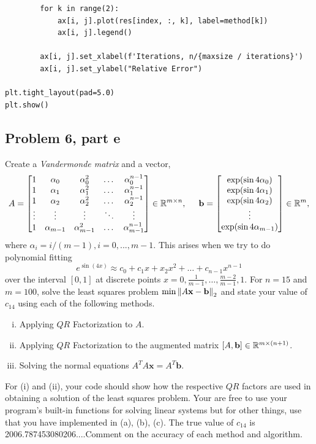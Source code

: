 \begin{solution}
\begin{lstlisting}
        for k in range(2):
            ax[i, j].plot(res[index, :, k], label=method[k])
            ax[i, j].legend()
            
        ax[i, j].set_xlabel(f'Iterations, n/{maxsize / iterations}')
        ax[i, j].set_ylabel("Relative Error")

plt.tight_layout(pad=5.0)
plt.show()
\end{lstlisting}
\end{solution}

\subsection{Problem 6, part e}
Create a \textit{Vandermonde matrix} and a vector,
\[
A = \mqty[
    1 &\alpha_0 &\alpha_0^2 &\dots &\alpha_0^{n-1} \\
    1 &\alpha_1 &\alpha_1^2 &\dots &\alpha_1^{n-1} \\
    1 &\alpha_2 &\alpha_2^2 &\dots &\alpha_2^{n-1} \\
    \vdots &\vdots &\vdots &\ddots &\vdots\\
    1 &\alpha_{m - 1} &\alpha_{m - 1}^2 &\dots &\alpha_{m - 1}^{n-1} 
        ]
        \in \R^{m\times n}, 
        \hspace{5mm}
        \textbf{b} = 
        \mqty[
        \exp (\sin 4\alpha_0)\\
        \exp (\sin 4\alpha_1)\\
        \exp (\sin 4\alpha_2)\\
        \vdots \\
        \exp (\sin 4\alpha_{m - 1})
        ] \in \R^m,
\]
where $\alpha_i = i/(m-1), i = 0, ..., m-1$. This arises when we try to do polynomial fitting
\[
e^{\sin(4x)} \approx c_0 + c_1x + x_2x^2 + \dots + c_{n-1}x^{n-1}
\]
over the interval $[0, 1]$ at discrete points $x = 0, \frac{1}{m-1}, \dots, \frac{m - 2}{m - 1}, 1$. For $n = 15$ and $m = 100$, solve the least squares problem $\min \norm{A\textbf{x} - \textbf{b}}_2$ and state your value of $c_{14}$ using each of the following methods.
\begin{enumerate}[(i)]
    \item Applying $QR$ Factorization to $A$.
    \item Applying $QR$ Factorization to the augmented matrix $[A, \textbf{b}] \in \mathbb{R}^{m \times (n+1)}$.
    \item Solving the normal equations $A^TA\textbf{x} = A^T\textbf{b}.$
\end{enumerate}
For (i) and (ii), your code should show how the respective $QR$ factors are used in obtaining a solution of the least squares problem. Your are free to use your program's built-in functions for solving linear systems but for other things, use that you have implemented in (a), (b), (c). The true value of $c_{14}$ is 2006.787453080206....Comment on the accuracy of each method and algorithm.

